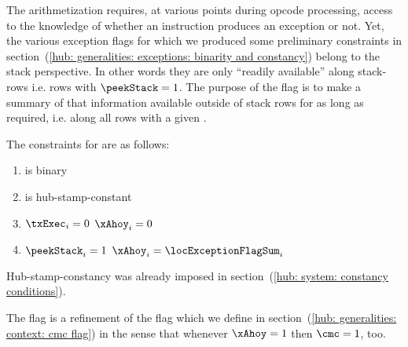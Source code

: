 The arithmetization requires, at various points during opcode processing, access to the knowledge of whether an instruction produces an exception or not.
Yet, the various exception flags for which we produced some preliminary constraints in section~(\ref{hub: generalities: exceptions: binarity and constancy}) belong to the stack perspective.
In other words they are only ``readily available'' along stack-rows i.e. rows with $\peekStack = 1$.
The purpose of the \xAhoy{} flag is to make a summary of that information available outside of stack rows for as long as required, i.e. along all rows with a given \hubStamp{}.

The constraints for \xAhoy{} are as follows:
\begin{enumerate}
	\item \xAhoy{} is binary
	\item \xAhoy{} is hub-stamp-constant
	\item \If $\txExec_{i} = 0$ \Then $\xAhoy_{i} = 0$
	\item \If $\peekStack_{i} = 1$ \Then $\xAhoy_{i} = \locExceptionFlagSum_{i}$
\end{enumerate}
\saNote{}
Hub-stamp-constancy was already imposed in section~(\ref{hub: system: constancy conditions}).

\saNote{}
The \xAhoy{} flag is a refinement of the \cmc{} flag which we define in section~(\ref{hub: generalities: context: cmc flag}) in the sense that whenever $\xAhoy = 1$ then $\cmc = 1$, too. 
